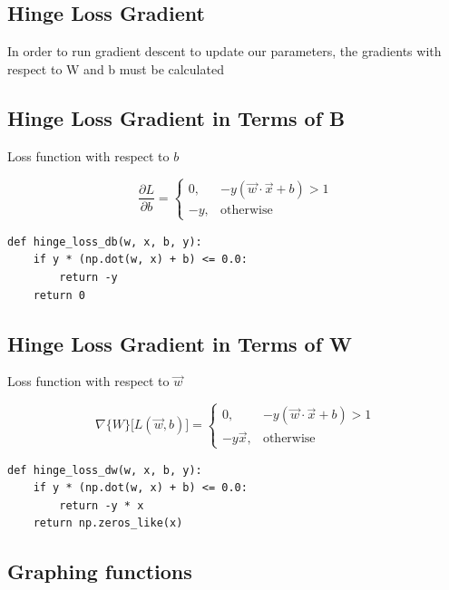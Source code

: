 \documentclass[openany]{book}
\begin{document}
    \subsection{Hinge Loss Gradient}\label{hinge-loss-gradient}

In order to run gradient descent to update our parameters, the gradients
with respect to W and b must be calculated

    \subsection{Hinge Loss Gradient in Terms of
B}\label{hinge-loss-gradient-in-terms-of-b}

Loss function with respect to \(b\)

\[
\frac{\partial L}{\partial b} =
\begin{cases}
0, & -y (\vec{w} \cdot \vec{x} + b) > 1 \\
-y, & \text{otherwise}
\end{cases}
\]

\begin{tcolorbox}
\tiny
\begin{verbatim}
def hinge_loss_db(w, x, b, y):
    if y * (np.dot(w, x) + b) <= 0.0:
        return -y
    return 0
\end{verbatim}
\end{tcolorbox}

    \subsection{Hinge Loss Gradient in Terms of
W}\label{hinge-loss-gradient-in-terms-of-w}

Loss function with respect to \(\vec{w}\)

\[
\nabla\{W\} {[}L(\vec{w}, b){]} =
\begin{cases}
0, & -y (\vec{w} \cdot \vec{x} + b) > 1 \\
-y \vec{x}, & \text{otherwise}
\end{cases}
\]

\begin{tcolorbox}
\tiny
\begin{verbatim}
def hinge_loss_dw(w, x, b, y):
    if y * (np.dot(w, x) + b) <= 0.0:
        return -y * x
    return np.zeros_like(x)
\end{verbatim}
\end{tcolorbox}

    \subsection{Graphing functions}\label{graphing-functions}
\end{document}
